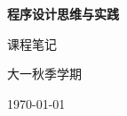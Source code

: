 \begin{titlepage}
\centering
\vspace*{6cm}
{\Huge\bfseries 程序设计思维与实践\par}
\vspace{1.5cm}
{\Large 课程笔记\par}
\vspace{1cm}
{\large 大一秋季学期\par}
\vfill
{\large \today\par}
\end{titlepage}
